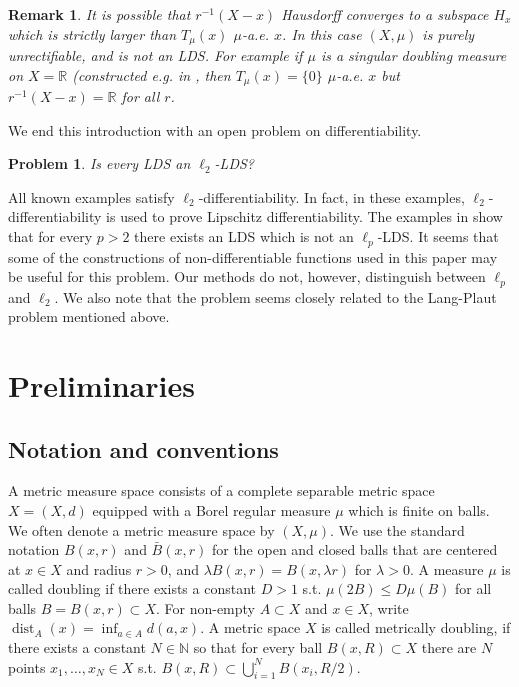 \documentclass{amsart}
\newtheorem{problem}[theorem]{Problem}
\newtheorem{remark}[theorem]{Remark}
\numberwithin{equation}{section}
\newcommand{\R}{\mathbb{R}}
\newcommand{\dist}{\operatorname{dist}}
\newcommand{\inv}{^{-1}}
\begin{document}
\begin{remark}
It is possible that $r\inv(X-x)$ Hausdorff converges to a subspace $H_x$ which is strictly larger than $T_\mu(x)$ $\mu$-a.e. $x$. In this case $(X,\mu)$ is purely unrectifiable, and is not an LDS. For example if $\mu$ is a singular doubling measure on $X=\R$ (constructed e.g. in , then $T_\mu(x)=\{0\}$ $\mu$-a.e. $x$ but $r\inv(X-x)=\R$ for all $r$.
\end{remark}



We end this introduction with an open problem on differentiability. 
\begin{problem}
    Is every LDS an $\ell_2$-LDS?
\end{problem}

All known examples \cite{waldbate,schioppadiff} satisfy $\ell_2$-differentiability. In fact, in these examples, $\ell_2$-differentiability is used to prove Lipschitz differentiability. The examples in \cite{waldbate} show that for every $p>2$ there exists an LDS which is not an $\ell_p$-LDS.  It seems that some of the constructions of non-differentiable functions used in this paper may be useful for this problem. Our methods do not, however, distinguish between $\ell_p$ and $\ell_2$. We also note that the problem seems closely related to the Lang-Plaut problem mentioned above.



\section{Preliminaries}

\subsection{Notation and conventions}

A metric measure space consists of a complete separable metric space $X=(X,d)$ equipped with a Borel regular measure $\mu$ which is finite on balls. We often denote a metric measure space by $(X,\mu)$. We use the standard notation $B(x,r)$ and $\bar{B}(x,r)$ for the open and closed balls that are  centered at $x\in X$ and radius $r>0$, and $\lambda B(x,r)=B(x,\lambda r)$ for $\lambda >0$. A measure $\mu$ is called doubling if there exists a constant $D>1$ s.t. $\mu(2B)\leq D\mu(B)$ for all balls $B=B(x,r)\subset X$. For non-empty $A\subset X$ and $x\in X$, write $\dist_A(x)=\inf_{a\in A} d(a,x)$. A metric space $X$ is called metrically doubling, if there exists a constant $N\in \mathbb{N}$ so that for every ball $B(x,R)\subset X$ there are $N$ points $x_1,\dots, x_N\in X$ s.t. $B(x,R)\subset \bigcup_{i=1}^N B(x_i, R/2)$.
\end{document}
